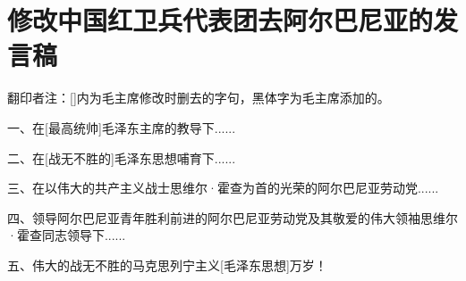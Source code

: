 \section[修改中国红卫兵代表团去阿尔巴尼亚的发言稿（一九六七年六月）]{修改中国红卫兵代表团去阿尔巴尼亚的发言稿}


翻印者注：[]内为毛主席修改时删去的字句，黑体字为毛主席添加的。

一、在[最高统帅]毛泽东主席的教导下......

二、在[战无不胜的]毛泽东思想哺育下......

三、在以伟大的共产主义战士思维尔·霍查为首的光荣的阿尔巴尼亚劳动党......

四、领导阿尔巴尼亚青年胜利前进的阿尔巴尼亚劳动党及其敬爱的伟大领袖思维尔·霍查同志领导下......

五、伟大的战无不胜的马克思列宁主义[毛泽东思想]万岁！

